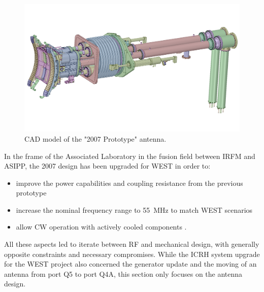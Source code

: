 \begin{figure}[h]
	\centering
	\includegraphics[width=1.0\linewidth]{figures/chap3/WEST_ICRH/proto2007_antenna}
	\caption{CAD model of the "2007 Prototype" antenna.}
	\label{fig:proto2007antenna}
\end{figure}

In the frame of the Associated Laboratory in the fusion field between IRFM and ASIPP, the 2007 design has been upgraded for WEST in order to: 
\begin{itemize}
	\item improve the power capabilities and coupling resistance from the previous prototype   
	\item increase the nominal frequency range to 55~MHz to match WEST scenarios
	\item allow CW operation with actively cooled components .
\end{itemize} 
All these aspects led to iterate between RF and mechanical design, with generally opposite constraints and necessary compromises. While the ICRH system upgrade for the WEST project also concerned the generator update and the moving of an antenna from port Q5 to port Q4A, this section only focuses on the antenna design. 


